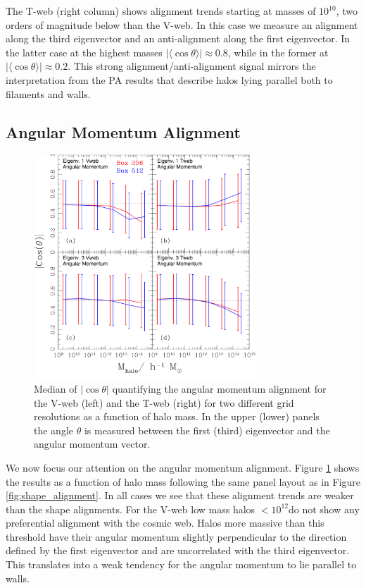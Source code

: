 \documentclass[useAMS,usenatbib]{mn2e}
\newcommand{\hMsun}{{\ifmmode{h^{-1}{\rm
        {M_{\odot}}}}\else{$h^{-1}{\rm{M_{\odot}}}$~}\fi}}
\newcommand{\muavg}{\vert\langle\cos\theta\rangle\vert}
\begin{document}
The T-web (right column) shows alignment trends starting at masses of
$10^{10}$\hMsun, two orders of magnitude below than the V-web. In this
case we measure an alignment along the third eigenvector and an
anti-alignment along the first eigenvector. In the latter case at the
highest masses $\muavg\approx 0.8$, while in the former at $\muavg\approx
0.2$. This strong alignment/anti-alignment signal mirrors the
interpretation from the PA results that describe halos lying parallel
both to filaments and walls.


\subsection{Angular Momentum Alignment}

\begin{figure}
\includegraphics[width=0.75\textwidth]{Fig3.pdf}
\caption{Median of $|\cos\theta|$ quantifying the angular momentum
  alignment for the V-web (left) and the T-web (right) for two different
  grid resolutions as a function of halo mass. In the upper (lower)
  panels the angle $\theta$ is measured between the first (third)
  eigenvector and the angular momentum
  vector.\label{fig:spin_alignment}} 
\end{figure}


We now focus our attention on the angular momentum alignment. Figure
\ref{fig:spin_alignment} shows the results as a function of halo mass
following the same panel layout as in Figure
\ref{fig:shape_alignment}. In all cases we see that these alignment
trends are weaker than the shape alignments. For the V-web low mass halos
$<10^{12}$\hMsun do not show any preferential alignment with the
cosmic web. Halos more massive than this threshold have their angular
momentum slightly perpendicular to the direction defined by the first
eigenvector and are uncorrelated with the third eigenvector. This translates
into a weak tendency for the angular momentum to lie parallel to walls.
\end{document}
